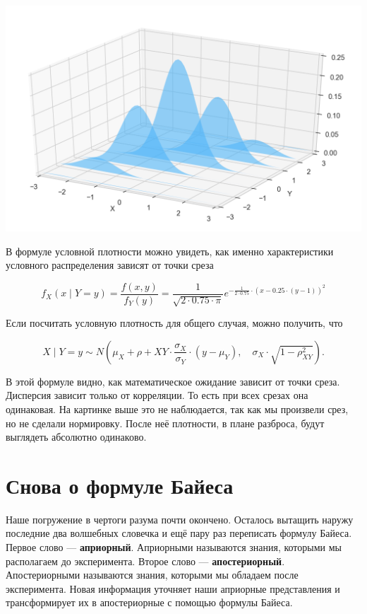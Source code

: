 \documentclass[12pt, a4paper, oneside]{extreport}
\newcommand{\indef}[1]{\textbf{#1}}     %
\theoremstyle{plain}              %
\theoremstyle{definition}         %
\begin{document}
\begin{center}
	\includegraphics[scale=0.22]{two_normal_3.png}
\end{center}

В формуле условной плотности можно увидеть, как именно характеристики условного распределения зависят от точки среза

\[
f_X(x \mid Y = y)  = \frac{f(x,y)}{f_Y(y)} = \frac{1}{\sqrt{2 \cdot 0.75 \cdot \pi}} e^{-\frac{1}{2 \cdot 0.75} \cdot(x - 0.25 \cdot(y-1))^2}
\]

Если посчитать условную плотность для общего случая, можно получить, что 

\[ X \mid Y=y \sim N \left(\mu_X + \rho+{XY} \cdot \frac{\sigma_X}{\sigma_Y} \cdot(y - \mu_Y), \quad \sigma_X \cdot \sqrt{1- \rho_{XY}^2} \right).\]

В этой формуле видно, как математическое ожидание зависит от точки среза. Дисперсия зависит только от корреляции. То есть при всех срезах она одинаковая. На картинке выше это не наблюдается, так как мы произвели срез, но не сделали нормировку. После неё плотности, в плане разброса, будут выглядеть абсолютно одинаково. 


\section{Снова о формуле Байеса}

Наше погружение в чертоги разума почти окончено. Осталось вытащить наружу последние два волшебных словечка и ещё пару раз переписать формулу Байеса.  Первое слово --- \indef{априорный}. Априорными называются знания, которыми мы располагаем до эксперимента. Второе слово --- \indef{апостериорный}. Апостериорными называются знания, которыми мы обладаем после эксперимента. Новая информация уточняет наши априорные представления и трансформирует их в апостериорные с помощью формулы Байеса.
\end{document}
